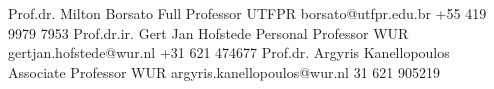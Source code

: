 %
%
%


\vspace{5pt}
\begin{referees}
		{Prof.dr. Milton Borsato}
		{Full Professor}
		{UTFPR}
		{borsato@utfpr.edu.br}
		{+55 419 9979 7953}
		{Prof.dr.ir. Gert Jan Hofstede}
		{Personal Professor}
		{WUR}
		{gertjan.hofstede@wur.nl}
		{+31 621 474677}
		{Prof.dr. Argyris Kanellopoulos}
		{Associate Professor}
		{WUR}
		{argyris.kanellopoulos@wur.nl}
		{31 621 905219}
\end{referees}
